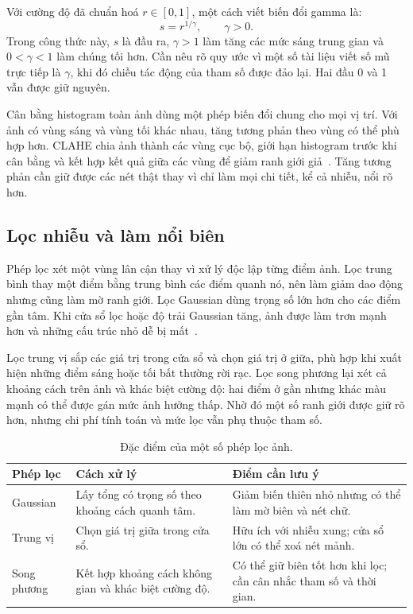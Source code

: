 Với cường độ đã chuẩn hoá $r\in[0,1]$, một cách viết biến đổi gamma là:
\begin{equation}
 s=r^{1/\gamma},\qquad \gamma>0.
 \label{eq:gamma_intensity}
\end{equation}
Trong công thức này, $s$ là đầu ra, $\gamma>1$ làm tăng các mức sáng trung gian và $0<\gamma<1$ làm chúng tối hơn. Cần nêu rõ quy ước vì một số tài liệu viết số mũ trực tiếp là $\gamma$, khi đó chiều tác động của tham số được đảo lại. Hai đầu 0 và 1 vẫn được giữ nguyên.

Cân bằng histogram toàn ảnh dùng một phép biến đổi chung cho mọi vị trí. Với ảnh có vùng sáng và vùng tối khác nhau, tăng tương phản theo vùng có thể phù hợp hơn. CLAHE chia ảnh thành các vùng cục bộ, giới hạn histogram trước khi cân bằng và kết hợp kết quả giữa các vùng để giảm ranh giới giả~\cite{opencv_clahe}. Tăng tương phản cần giữ được các nét thật thay vì chỉ làm mọi chi tiết, kể cả nhiễu, nổi rõ hơn.

\subsection{Lọc nhiễu và làm nổi biên}
Phép lọc xét một vùng lân cận thay vì xử lý độc lập từng điểm ảnh. Lọc trung bình thay một điểm bằng trung bình các điểm quanh nó, nên làm giảm dao động nhưng cũng làm mờ ranh giới. Lọc Gaussian dùng trọng số lớn hơn cho các điểm gần tâm. Khi cửa sổ lọc hoặc độ trải Gaussian tăng, ảnh được làm trơn mạnh hơn và những cấu trúc nhỏ dễ bị mất~\cite{tomasi1998bilateral,opencv_filtering}.

Lọc trung vị sắp các giá trị trong cửa sổ và chọn giá trị ở giữa, phù hợp khi xuất hiện những điểm sáng hoặc tối bất thường rời rạc. Lọc song phương lại xét cả khoảng cách trên ảnh và khác biệt cường độ: hai điểm ở gần nhưng khác màu mạnh có thể được gán mức ảnh hưởng thấp. Nhờ đó một số ranh giới được giữ rõ hơn, nhưng chi phí tính toán và mức lọc vẫn phụ thuộc tham số.

\begin{table}[H]
\centering
\caption{Đặc điểm của một số phép lọc ảnh.}
\label{tab:filters_theory}
\small
\begin{tabularx}{\textwidth}{|>{\raggedright\arraybackslash}p{2.4cm}|>{\raggedright\arraybackslash}X|>{\raggedright\arraybackslash}X|}
\toprule
\textbf{Phép lọc} & \textbf{Cách xử lý} & \textbf{Điểm cần lưu ý} \\
\midrule
Gaussian & Lấy tổng có trọng số theo khoảng cách quanh tâm. & Giảm biến thiên nhỏ nhưng có thể làm mờ biên và nét chữ. \\ \hline
Trung vị & Chọn giá trị giữa trong cửa sổ. & Hữu ích với nhiễu xung; cửa sổ lớn có thể xoá nét mảnh. \\ \hline
Song phương & Kết hợp khoảng cách không gian và khác biệt cường độ. & Có thể giữ biên tốt hơn khi lọc; cần cân nhắc tham số và thời gian. \\
\bottomrule
\end{tabularx}
\end{table}

